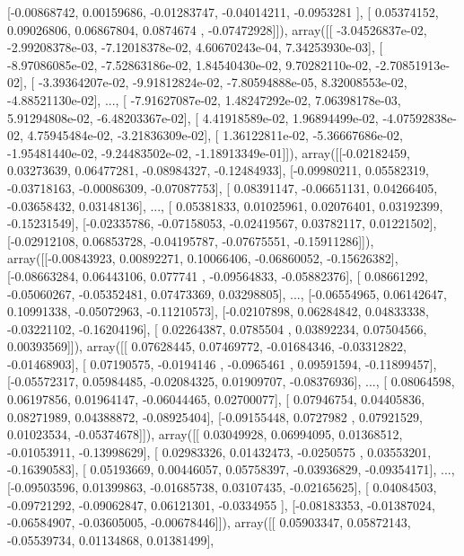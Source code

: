 \documentclass{article}
\begin{document}
       [-0.00868742,  0.00159686, -0.01283747, -0.04014211, -0.0953281 ],
       [ 0.05374152,  0.09026806,  0.06867804,  0.0874674 , -0.07472928]]), array([[ -3.04526837e-02,  -2.99208378e-03,  -7.12018378e-02,
          4.60670243e-04,   7.34253930e-03],
       [ -8.97086085e-02,  -7.52863186e-02,   1.84540430e-02,
          9.70282110e-02,  -2.70851913e-02],
       [ -3.39364207e-02,  -9.91812824e-02,  -7.80594888e-05,
          8.32008553e-02,  -4.88521130e-02],
       ..., 
       [ -7.91627087e-02,   1.48247292e-02,   7.06398178e-03,
          5.91294808e-02,  -6.48203367e-02],
       [  4.41918589e-02,   1.96894499e-02,  -4.07592838e-02,
          4.75945484e-02,  -3.21836309e-02],
       [  1.36122811e-02,  -5.36667686e-02,  -1.95481440e-02,
         -9.24483502e-02,  -1.18913349e-01]]), array([[-0.02182459,  0.03273639,  0.06477281, -0.08984327, -0.12484933],
       [-0.09980211,  0.05582319, -0.03718163, -0.00086309, -0.07087753],
       [ 0.08391147, -0.06651131,  0.04266405, -0.03658432,  0.03148136],
       ..., 
       [ 0.05381833,  0.01025961,  0.02076401,  0.03192399, -0.15231549],
       [-0.02335786, -0.07158053, -0.02419567,  0.03782117,  0.01221502],
       [-0.02912108,  0.06853728, -0.04195787, -0.07675551, -0.15911286]]), array([[-0.00843923,  0.00892271,  0.10066406, -0.06860052, -0.15626382],
       [-0.08663284,  0.06443106,  0.077741  , -0.09564833, -0.05882376],
       [ 0.08661292, -0.05060267, -0.05352481,  0.07473369,  0.03298805],
       ..., 
       [-0.06554965,  0.06142647,  0.10991338, -0.05072963, -0.11210573],
       [-0.02107898,  0.06284842,  0.04833338, -0.03221102, -0.16204196],
       [ 0.02264387,  0.0785504 ,  0.03892234,  0.07504566,  0.00393569]]), array([[ 0.07628445,  0.07469772, -0.01684346, -0.03312822, -0.01468903],
       [ 0.07190575, -0.0194146 , -0.0965461 ,  0.09591594, -0.11899457],
       [-0.05572317,  0.05984485, -0.02084325,  0.01909707, -0.08376936],
       ..., 
       [ 0.08064598,  0.06197856,  0.01964147, -0.06044465,  0.02700077],
       [ 0.07946754,  0.04405836,  0.08271989,  0.04388872, -0.08925404],
       [-0.09155448,  0.0727982 ,  0.07921529,  0.01023534, -0.05374678]]), array([[ 0.03049928,  0.06994095,  0.01368512, -0.01053911, -0.13998629],
       [ 0.02983326,  0.01432473, -0.0250575 ,  0.03553201, -0.16390583],
       [ 0.05193669,  0.00446057,  0.05758397, -0.03936829, -0.09354171],
       ..., 
       [-0.09503596,  0.01399863, -0.01685738,  0.03107435, -0.02165625],
       [ 0.04084503, -0.09721292, -0.09062847,  0.06121301, -0.0334955 ],
       [-0.08183353, -0.01387024, -0.06584907, -0.03605005, -0.00678446]]), array([[ 0.05903347,  0.05872143, -0.05539734,  0.01134868,  0.01381499],
\end{document}
